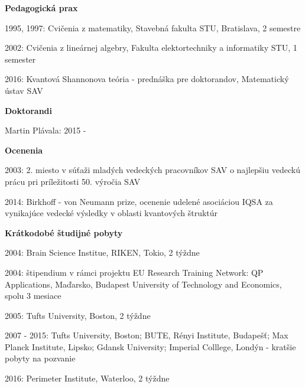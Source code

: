 \documentclass[12pt]{article}
\begin{document}
\noindent
\textbf{Pedagogická prax}
\begin{description}[noitemsep,leftmargin=1.3cm, font=\normalfont]
\item{1995, 1997:} Cvičenia z matematiky, Stavebná fakulta STU, Bratislava, 2 semestre
\item{2002:} Cvičenia z lineárnej algebry, Fakulta elektortechniky a informatiky STU, 1 semester
\item{2016:} Kvantová Shannonova teória - prednáška pre doktorandov, Matematický ústav SAV
\end{description}



\noindent
\textbf{Doktorandi}
\begin{description}[noitemsep,leftmargin=1.3cm, font=\normalfont]
\item{Martin Plávala:} 2015 -  
\end{description}

\noindent
\textbf{Ocenenia}
\begin{description}[noitemsep,leftmargin=1.3cm, font=\normalfont]
\item{2003: }   2. miesto v súťaži  mladých vedeckých pracovníkov SAV o najlepšiu vedeckú prácu pri príležitosti 50. výročia SAV

\item{2014:} Birkhoff - von Neumann prize, ocenenie udelené asociáciou IQSA za vynikajúce vedecké výsledky v oblasti kvantových štruktúr
\end{description}

\noindent
\textbf{Krátkodobé študijné pobyty}
\begin{description}[noitemsep,leftmargin=1.3cm, font=\normalfont]
\item{2004:}  Brain Science Institue, RIKEN, Tokio, 2 týždne
\item{2004:} štipendium v rámci projektu EU Research Training Network: QP Applications, Maďarsko, Budapest University of Technology and Economics, spolu 3 mesiace
\item{2005:} Tufts University, Boston, 2 týždne
\item{2007 - 2015:} Tufts University, Boston; BUTE, Rényi Institute, Budapešť; Max Planck Institute, Lipsko; Gdansk University;  Imperial Colllege, Londýn - kratšie pobyty na pozvanie
\item{2016:}  Perimeter Institute, Waterloo, 2 týždne
\end{description}
\end{document}
